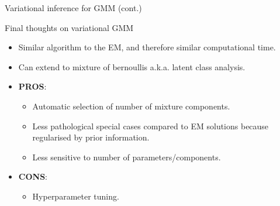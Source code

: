 \begin{frame}{Variational inference for GMM (cont.)}
\begin{figure}
  \end{figure}
\end{frame}

\begin{frame}{Final thoughts on variational GMM}
  \begin{itemize}
    \item Similar algorithm to the EM, and therefore similar computational time.
    \item Can extend to mixture of bernoullis a.k.a. latent class analysis. 
    \item \textbf{PROS}:
    \begin{itemize}
      \item Automatic selection of number of mixture components.
      \item Less pathological special cases compared to EM solutions because regularised by prior information.
      \item Less sensitive to number of parameters/components.
    \end{itemize}
    \item \textbf{CONS}:
    \begin{itemize}
      \item Hyperparameter tuning.
    \end{itemize}
  \end{itemize}
\end{frame}
